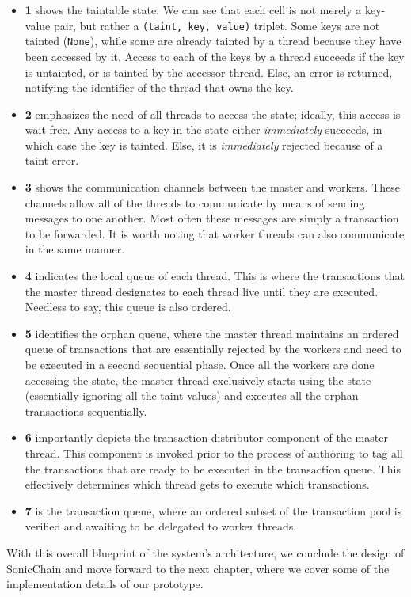 \begin{itemize}
    \item \textbf{1} shows the taintable state. We can see that each cell is not merely a key-value
    pair, but rather a \texttt{(taint, key, value)} triplet. Some keys are not tainted
    (\texttt{None}), while some are already tainted by a thread because they have been accessed by
    it. Access to each of the keys by a thread succeeds if the key is untainted, or is tainted by
    the accessor thread. Else, an error is returned, notifying the identifier of the thread that
    owns the key.
    \item \textbf{2} emphasizes the need of all threads to access the state; ideally, this access is
    wait-free. Any access to a key in the state either \textit{immediately} succeeds, in which case
    the key is tainted. Else, it is \textit{immediately} rejected because of a taint error.
    \item \textbf{3} shows the communication channels between the master and workers. These channels
    allow all of the threads to communicate by means of sending messages to one another. Most often
    these messages are simply a transaction to be forwarded. It is worth noting that worker threads
    can also communicate in the same manner.
    \item \textbf{4} indicates the local queue of each thread. This is where the transactions that
    the master thread designates to each thread live until they are executed. Needless to say, this
    queue is also ordered.
    \item \textbf{5} identifies the orphan queue, where the master thread maintains an ordered queue
    of transactions that are essentially rejected by the workers and need to be executed in a second
    sequential phase. Once all the workers are done accessing the state, the master thread
    exclusively starts using the state (essentially ignoring all the taint values) and executes all
    the orphan transactions sequentially.
    \item \textbf{6} importantly depicts the transaction distributor component of the master thread.
    This component is invoked prior to the process of authoring to tag all the transactions that are
    ready to be executed in the transaction queue. This effectively determines which thread gets to
    execute which transactions.
    \item \textbf{7} is the transaction queue, where an ordered subset of the transaction pool is
    verified and awaiting to be delegated to worker threads.
\end{itemize}

With this overall blueprint of the system's architecture, we conclude the design of SonicChain and
move forward to the next chapter, where we cover some of the implementation details of our
prototype.






